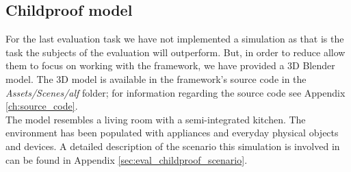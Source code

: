 \subsection{Childproof model} %
\label{subsec:impl_childproof_model}
For the last evaluation task we have not implemented a simulation as that is the task the subjects of the evaluation will outperform. But, in order to reduce allow them to focus on working with the framework, we have provided a 3D Blender model. The 3D model is available in the framework's source code in the \emph{Assets/Scenes/alf} folder; for information regarding the source code see Appendix \ref{ch:source_code}.\\

The model resembles a living room with a semi-integrated kitchen. The environment has been populated with appliances and everyday physical objects and devices. A detailed description of the scenario this simulation is involved in can be found in Appendix \ref{sec:eval_childproof_scenario}.

